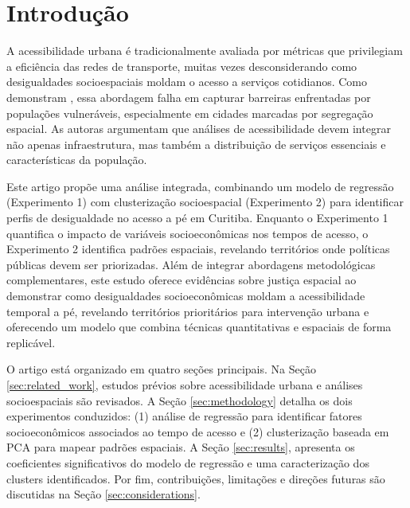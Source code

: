 \section{Introdução}

A acessibilidade urbana é tradicionalmente avaliada por métricas que privilegiam a eficiência das redes de transporte, muitas vezes desconsiderando como desigualdades socioespaciais moldam o acesso a serviços cotidianos. Como demonstram \cite{FolGallez2014}, essa abordagem falha em capturar barreiras enfrentadas por populações vulneráveis, especialmente em cidades marcadas por segregação espacial. As autoras argumentam que análises de acessibilidade devem integrar não apenas infraestrutura, mas também a distribuição de serviços essenciais e características da população.

Este artigo propõe uma análise integrada, combinando um modelo de regressão (Experimento 1) com clusterização socioespacial (Experimento 2) para identificar perfis de desigualdade no acesso a pé em Curitiba. Enquanto o Experimento 1 quantifica o impacto de variáveis socioeconômicas nos tempos de acesso, o Experimento 2 identifica padrões espaciais, revelando territórios onde políticas públicas devem ser priorizadas. Além de integrar abordagens metodológicas complementares, este estudo oferece evidências sobre justiça espacial ao demonstrar como desigualdades socioeconômicas moldam a acessibilidade temporal a pé, revelando territórios prioritários para intervenção urbana e oferecendo um modelo que combina técnicas quantitativas e espaciais de forma replicável.

O artigo está organizado em quatro seções principais. Na Seção \ref{sec:related_work}, estudos prévios sobre acessibilidade urbana e análises socioespaciais são revisados. A Seção \ref{sec:methodology} detalha os dois experimentos conduzidos: (1) análise de regressão para identificar fatores socioeconômicos associados ao tempo de acesso e (2) clusterização baseada em PCA para mapear padrões espaciais. A Seção \ref{sec:results}, apresenta os coeficientes significativos do modelo de regressão e uma caracterização dos clusters identificados. Por fim, contribuições, limitações e direções futuras são discutidas na Seção \ref{sec:considerations}.

